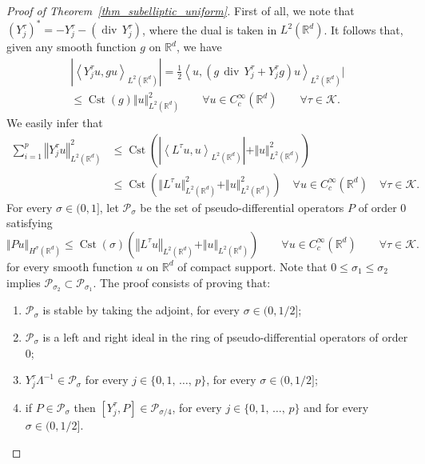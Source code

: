 \documentclass[10pt]{amsart}
\theoremstyle{definition}\newtheorem{defi}[theo]{Definition}\newtheorem{rema}[theo]{Remark}\newtheorem{exam}[theo]{Example}\newtheorem{exem}[theo]{Example}\newtheorem{nota}[theo]{Notation}
\newcommand*\R{\mathbb{R}}
\newcommand{\calK}{\mathcal{K}}
\newcommand{\calP}{\mathcal{P}}
\DeclareMathOperator{\Cst}{Cst}
\DeclareMathOperator{\divl}{div}
\renewcommand{\leq}{\leqslant}
\let\oldforall\forall
\renewcommand*{\forall}{\mathrel{\oldforall}}
\begin{document}
\begin{proof}[Proof of Theorem~\ref{thm_subelliptic_uniform}]
First of all, we note that $(Y_j^\tau)^*=-Y_j^\tau-(\divl\, Y_j^\tau)$, where the dual is taken in $L^2(\R^d)$. It follows that, given any smooth function $g$ on $\R^d$, we have
\begin{multline*}
\left\vert\left\langle Y_j^\tau u,gu\right\rangle_{L^2\left(\R^d\right)}\right\vert = \frac{1}{2} \left\langle u, \left(g\,\divl\, Y_j^\tau+Y_j^\tau g\right)u\right\rangle_{L^2\left(\R^d\right)}\bigg\vert\\
\leq \Cst(g) \Vert u\Vert_{L^2\left(\R^d\right)}^2 
\qquad\forall u\in C_c^\infty\left(\R^d\right)\qquad \forall \tau\in\calK.
\end{multline*}
We easily infer that
\begin{align*}
\sum_{i=1}^p \left\Vert Y_j^\tau u\right\Vert_{L^2\left(\R^d\right)}^2 &\leq \Cst\left(\left\vert\left\langle L^\tau u,u\right\rangle_{L^2\left(\R^d\right)}\right\vert+\Vert u\Vert_{L^2\left(\R^d\right)}^2\right) \\
&\leq \Cst \left(\Vert L^\tau u\Vert_{L^2\left(\R^d\right)}^2+\Vert u\Vert_{L^2\left(\R^d\right)}^2 \right)
\quad \forall u\in C_c^\infty\left(\R^d\right) \quad \forall \tau\in\calK.
\end{align*}
For every $\sigma\in(0,1]$, let $\calP_\sigma$ be the set of pseudo-differential operators $P$ of order $0$ satisfying
\[
\Vert Pu\Vert_{H^\sigma\left(\R^d\right)} \leq \Cst(\sigma) \left(\left\Vert L^\tau u\right\Vert_{L^2\left(\R^d\right)} + \Vert u \Vert_{L^2\left(\R^d\right)} \right)
\qquad \forall u\in C_c^\infty\left(\R^d\right) \qquad \forall \tau\in\calK.
\]
for every smooth function $u$ on $\R^d$ of compact support. Note that $0\leq \sigma_1\leq \sigma_2$ implies $\calP_{\sigma_2}\subset\calP_{\sigma_1}$. The proof consists of proving that:
\begin{enumerate}
\item $\calP_\sigma$ is stable by taking the adjoint, for every $\sigma\in(0,1/2]$;
\item $\calP_\sigma$ is a left and right ideal in the ring of pseudo-differential operators of order $0$;
\item $Y_j^\tau\Lambda^{-1}\in\calP_\sigma$ for every $j\in\{0,1,\,\ldots,\,p\}$, for every $\sigma\in(0,1/2]$;
\item if $P\in \calP_\sigma$ then $[Y_j^\tau,P]\in \calP_{\sigma/4}$, for every $j\in\{0,1,\,\ldots,\,p\}$ and for every $\sigma\in(0,1/2]$.
\end{enumerate}

\end{proof}
\end{document}
